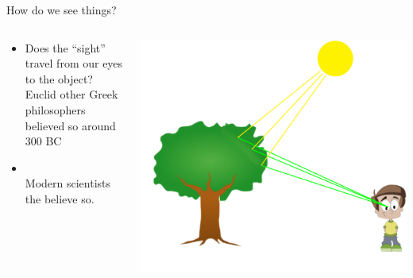 \begin{frame}{How do we see things?}
  \begin{columns}
    \begin{column}{0.7\textwidth}
      \begin{itemize}
        \item
          Does the ``sight'' travel from our eyes to the object?\\
           {\color{red}Euclid other Greek philosophers believed so around 300 BC}
       \item
         \color{black}{or the ``light'' travels from the object to our eyes?}\\
          {\color{red}Modern scientists the believe so.}
      \end{itemize}
    \end{column}
    \hspace{-2cm}
    \begin{column}{0.3\textwidth}
      \centering
        \includegraphics[width=1.4\textwidth]{media/suntreeboy.pdf}
    \end{column}
  \end{columns}
\end{frame}

% 

